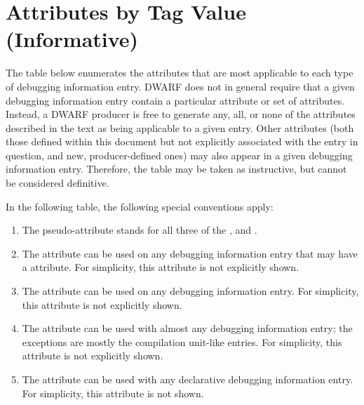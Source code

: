 \chapter[Attributes by Tag (Informative)]{Attributes by Tag Value (Informative)}
\label{chap:attributesbytagvalueinformative}

The table below enumerates the attributes that are
most applicable to each type of debugging information
entry. DWARF does not in general require that a given
debugging information entry contain a particular attribute
or set of attributes. Instead, a DWARF producer is free to
generate any, all, or none of the attributes described in the
text as being applicable to a given entry. Other attributes
(both those defined within this document but not explicitly
associated with the entry in question, and new,
\bb
producer-defined
\eb
ones) may also appear in a given debugging information
entry. Therefore, the table may be taken as instructive, but
cannot be considered definitive.

In the following table, the following special conventions apply:
\begin{enumerate}[1. ]

\item The
pseudo-attribute stands for all three of the
\DWATdeclcolumn,
\DWATdeclfile{} and
\DWATdeclline.

\item The \DWATdescription{} attribute can be used on any
debugging information entry that may have a \DWATname{} attribute.
For simplicity, this attribute is not explicitly shown.

\item The \DWATsibling{} attribute can be used on any
debugging information entry.
For simplicity, this attribute is not explicitly shown.

\item The \DWATabstractorigin{} attribute can be used with
almost any debugging information entry;
the exceptions are mostly the compilation
unit-like entries.
For simplicity, this attribute is not explicitly shown.

\bb
\item
The \DWATartificial{} attribute can be used with any declarative
debugging information entry. For simplicity, this attribute is
not shown.
\eb

\end{enumerate}

\small

